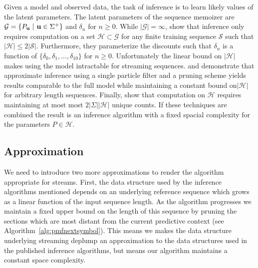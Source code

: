 Given a model and observed data,  the task of inference is to learn likely values of the latent parameters.  The latent parameters of the sequence memoizer are  $\mathcal{G} = \{P_{\bf u} \ | \ {\bf u} \in \Sigma^{+} \}$ and $\delta_n$ for $n \geq 0$.  While $| \mathcal{G}| = \infty$, \citep{Wood2009} show that inference only requires computation on a set $\mathcal{H} \subset \mathcal{G}$ for any finite training sequence $\mathcal{S}$ such that $|\mathcal{H} | \leq 2 |\mathcal{S}|$.  Furthermore, they parameterize the discounts such that $\delta_n$ is a function of $\{\delta_0, \delta_1, \ldots, \delta_{10} \}$ for $n \geq 0$.   Unfortunately the linear bound on $|\mathcal{H}|$ makes using the model intractable for streaming sequences. \citep{Bartlett2010} and \citep{Gasthaus2010} demonstrate that approximate inference using a single particle filter and a pruning scheme yields results comparable to the full model while maintaining a constant bound on$| \mathcal{H}| $ for arbitrary length sequences.  Finally, \cite{Gasthaus2011} show that computation on $\mathcal{H}$ requires maintaining at most most $2|\Sigma| |\mathcal{H}|$ unique counts.  If these techniques are combined the result is an inference algorithm with a fixed spacial complexity for the parameters $P \in \mathcal{H}$.  

%
\subsection{Approximation}

We need to introduce two more approximations to render the algorithm appropriate for streams.  First, the data structure used by the inference algorithms mentioned depends on an underlying reference sequence which grows as a linear function of the input sequence length.  As the algorithm progresses we maintain a fixed upper bound on the length of this sequence by pruning the sections which are most distant from the current predictive context (see Algorithm~\ref{alg:pmfnextsymbol}).  This means we makes the data structure underlying streaming deplump an approximation to the data structures used in the published inference algorithms, but means our algorithm maintains a constant space complexity.

